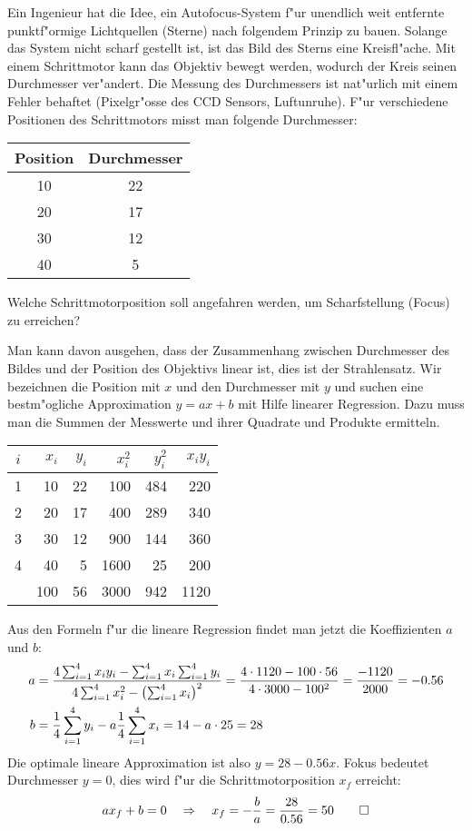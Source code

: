 Ein Ingenieur hat die Idee, ein Autofocus-System f"ur unendlich weit
entfernte punktf"ormige
Lichtquellen (Sterne) nach folgendem Prinzip zu bauen.
Solange das System nicht scharf gestellt ist,
ist das Bild des Sterns eine Kreisfl"ache.
Mit einem Schrittmotor kann das Objektiv bewegt werden, wodurch der Kreis
seinen Durchmesser ver"andert. Die Messung des Durchmessers ist 
nat"urlich mit einem Fehler behaftet (Pixelgr"osse des CCD Sensors,
Luftunruhe).
F"ur verschiedene Positionen des Schrittmotors misst man folgende
Durchmesser:
\begin{center}
\begin{tabular}{|c|c|}
\hline
Position&Durchmesser\\
\hline
10&22\\
20&17\\
30&12\\
40&5\\
\hline
\end{tabular}
\end{center}
Welche Schrittmotorposition soll angefahren werden, um Scharfstellung
(Focus) zu erreichen?

\begin{loesung}
Man kann davon ausgehen, dass der Zusammenhang zwischen Durchmesser
des Bildes und der Position des Objektivs linear ist, dies ist der
Strahlensatz. Wir bezeichnen die Position mit $x$ und den Durchmesser
mit $y$ und suchen eine bestm"ogliche Approximation $y=ax+b$ mit
Hilfe linearer Regression. Dazu muss man die Summen der Messwerte und
ihrer Quadrate und Produkte ermitteln.
\begin{center}
\begin{tabular}{|c|rr|rrr|}
\hline
$i$&$x_i$&$y_i$&$x_i^2$&$y_i^2$&$x_iy_i$\\
\hline
1& 10&22& 100&484& 220\\
2& 20&17& 400&289& 340\\
3& 30&12& 900&144& 360\\
4& 40& 5&1600& 25& 200\\
\hline
 &100&56&3000&942&1120\\
\hline
\end{tabular}
\end{center}
Aus den Formeln f"ur die lineare Regression findet man jetzt die
Koeffizienten $a$ und $b$:
\begin{align*}
a&=\frac{
4\sum_{i=1}^4 x_iy_i-\sum_{i=1}^4x_i\sum_{i=1}^4y_i
}{
4\sum_{i=1}^4x_i^2-\bigl(\sum_{i=1}^4 x_i\bigr)^2
}
=
\frac{4\cdot 1120-100\cdot 56}{4\cdot 3000-100^2}=\frac{-1120}{2000}=-0.56
\\
b&=\frac14\sum_{i=1}^4y_i-a\frac14\sum_{i=1}^4x_i
=14 - a\cdot 25=28
\end{align*}
Die optimale lineare Approximation ist also $y=28-0.56x$.
Fokus bedeutet Durchmesser $y=0$, dies wird f"ur die Schrittmotorposition
$x_f$ erreicht:
\[
ax_f+b=0\quad\Rightarrow\quad x_f=-\frac{b}{a}=\frac{28}{0.56}=50
\qedhere
\]
\end{loesung}

